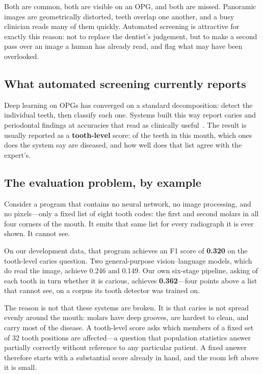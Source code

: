 \documentclass[conference]{IEEEtran}
\begin{document}
Both are common, both are visible on an OPG, and both are missed. Panoramic
images are geometrically distorted, teeth overlap one another, and a busy
clinician reads many of them quickly. Automated screening is attractive for
exactly this reason: not to replace the dentist's judgement, but to make a
second pass over an image a human has already read, and flag what may have been
overlooked.

\subsection*{What automated screening currently reports}

Deep learning on OPGs has converged on a standard decomposition: detect the
individual teeth, then classify each one. Systems built this way report caries
and periodontal findings at accuracies that read as clinically
useful~\cite{lim2024dual,chen2024cariesxrays,bilal2024pdcnet}. The result is
usually reported as a \textbf{tooth-level} score: of the teeth in this
mouth, which ones does the system say are diseased, and how well does that list
agree with the expert's.

\subsection*{The evaluation problem, by example}

Consider a program that contains no neural network, no image processing, and no
pixels---only a fixed list of eight tooth codes: the first and second molars in
all four corners of the mouth. It emits that same list for every radiograph it
is ever shown. It cannot see.

On our development data, that program achieves an F1 score of \textbf{0.320} on
the tooth-level caries question. Two general-purpose vision--language models,
which do read the image, achieve 0.246 and 0.149. Our own six-stage pipeline,
asking of each tooth in turn whether it is carious, achieves \textbf{0.362}---four
points above a list that cannot see, on a corpus its tooth detector was trained on.

The reason is not that these systems are broken. It is that caries is not spread
evenly around the mouth: molars have deep grooves, are hardest to clean, and
carry most of the disease. A tooth-level score asks which members of a fixed set
of 32 tooth positions are affected---a question that population statistics
answer partially correctly without reference to any particular patient. A fixed
answer therefore starts with a substantial score already in hand, and the room
left above it is small.
\end{document}

